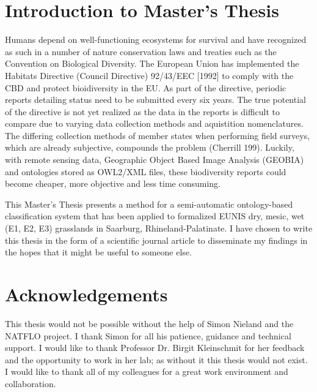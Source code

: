 \begin{titlepage}
    \section{Introduction to Master's Thesis}
    Humans depend on well-functioning ecosystems for survival and have
    recognized as such in a number of nature conservation laws and treaties such
    as the Convention on Biological Diversity. The European Union has
    implemented the Habitats Directive (Council Directive) 92/43/EEC [1992] to
    comply with the CBD and protect bioidiversity in the EU. As part of the
    directive, periodic reports detailing status need to be submitted every six
    years. The true potential of the directive is not yet realized as the data
    in the reports is difficult to compare due to varying data collection
    methods and aquistition nomenclatures. The differing collection methods of
    member states when performing field surveys, which are already subjective,
    compounds the problem (Cherrill 199). Luckily, with remote sensing data,
    Geographic Object Based Image Analysis (GEOBIA) and ontologies stored as
    OWL2/XML files, these biodiversity reports could become cheaper, more
    objective and less time consuming.

    This Master's Thesis presents a method for a semi-automatic ontology-based
    classification system that has been applied to formalized EUNIS dry, mesic,
    wet (E1, E2, E3) grasslands in Saarburg, Rhineland-Palatinate. I have chosen
    to write this thesis in the form of a scientific journal article to
    disseminate my findings in the hopes that it might be useful to someone
    else.

    \section{Acknowledgements}
    This thesis would not be possible without the help of Simon Nieland and the
    NATFLO project. I thank Simon for all his patience, guidance and technical
    support. I would like to thank Professor Dr. Birgit Kleinschmit for her feedback
    and the opportunity to work in her lab; as without it this thesis would not
    exist. I would like to thank all of my colleagues for a great work
    environment and collaboration. 


    
\end{titlepage}
